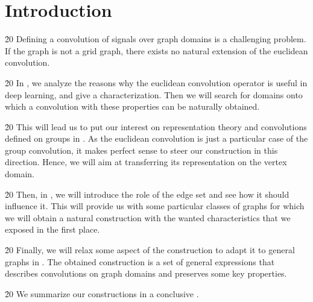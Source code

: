 \section*{Introduction}

\h{20}
Defining a convolution of signals over graph domains is a challenging problem. If the graph is not a grid graph, there exists no natural extension of the euclidean convolution.

\h{20}
In , we analyze the reasons why the euclidean convolution operator is useful in deep learning, and give a characterization. Then we will search for domains onto which a convolution with these properties can be naturally obtained.

\h{20}
This will lead us to put our interest on representation theory and convolutions defined on groups in . As the euclidean convolution is just a particular case of the group convolution, it makes perfect sense to steer our construction in this direction. Hence, we will aim at transferring its representation on the vertex domain.%

\h{20}
Then, in , we will introduce the role of the edge set and see how it should influence it. This will provide us with some particular classes of graphs for which we will obtain a natural construction with the wanted characteristics that we exposed in the first place.

\h{20}
Finally, we will relax some aspect of the construction to adapt it to general graphs in . The obtained construction is a set of general expressions that describes convolutions on graph domains and preserves some key properties.

\h{20}
We summarize our constructions in a conclusive .